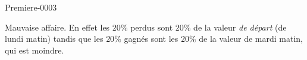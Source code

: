 
\begin{corrige}{Premiere-0003}

    Mauvaise affaire. En effet les \( 20\%\) perdus sont \( 20\%\) de la valeur \emph{de départ} (de lundi matin) tandis que les \( 20\%\) gagnés sont les \( 20\%\) de la valeur de mardi matin, qui est moindre.

\end{corrige}
